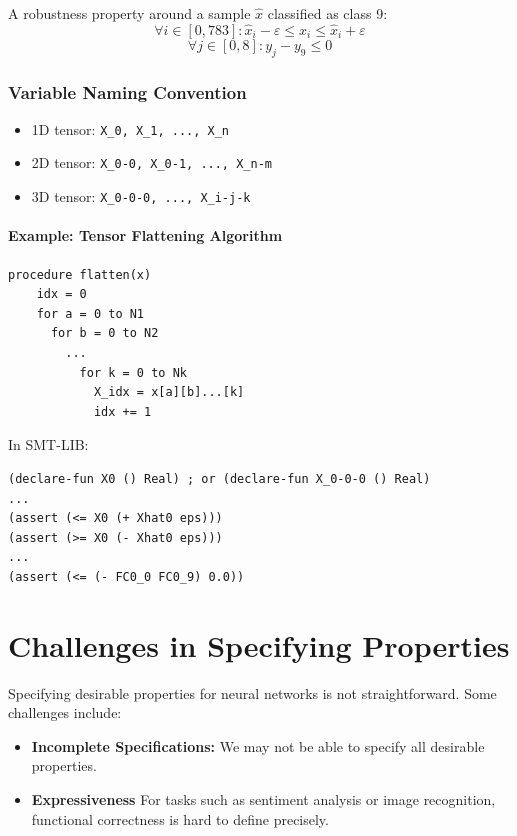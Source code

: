 \documentclass[oneside,11pt,dvipsnames]{book}
\newcommand{\mycomment}[3][\color{blue}]{{#1{{#2}: {#3}}}}
\newcommand{\tvn}[1]{\mycomment{TVN}{#1}}{}
\begin{document}
A robustness property around a sample $\hat{x}$ classified as class 9:
\[
\forall i \in [0, 783] : \hat{x}_i - \varepsilon \leq x_i \leq \hat{x}_i + \varepsilon
\]
\[
\forall j \in [0,8] : y_j - y_9 \leq 0
\]

\subsubsection*{Variable Naming Convention}
\begin{itemize}
    \item 1D tensor: \texttt{X\_0, X\_1, ..., X\_n}
    \item 2D tensor: \texttt{X\_0-0, X\_0-1, ..., X\_n-m}
    \item 3D tensor: \texttt{X\_0-0-0, ..., X\_i-j-k}
\end{itemize}

\paragraph{Example: Tensor Flattening Algorithm}
\begin{lstlisting}
procedure flatten(x)
    idx = 0
    for a = 0 to N1
      for b = 0 to N2
        ...
          for k = 0 to Nk
            X_idx = x[a][b]...[k]
            idx += 1
\end{lstlisting}

\noindent In SMT-LIB:
\begin{lstlisting}
(declare-fun X0 () Real) ; or (declare-fun X_0-0-0 () Real)
...
(assert (<= X0 (+ Xhat0 eps)))
(assert (>= X0 (- Xhat0 eps)))
...
(assert (<= (- FC0_0 FC0_9) 0.0))
\end{lstlisting}


\section{Challenges in Specifying Properties}\tvn{TODO}

Specifying desirable properties for neural networks is not straightforward. Some challenges include:
\begin{itemize}
    \item \textbf{Incomplete Specifications:} We may not be able to specify all desirable properties.
    \item \textbf{Expressiveness} For tasks such as sentiment analysis or image recognition, functional correctness is hard to define precisely.
\end{itemize}
\end{document}

